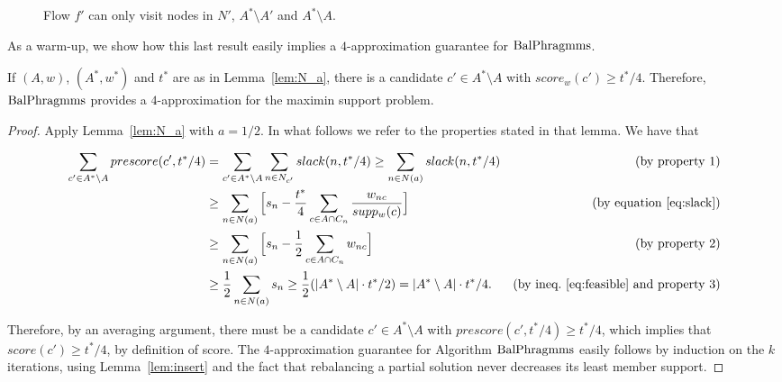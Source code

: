 \begin{figure}[htb]
\begin{center}
{
}
\end{center}
\caption{Flow $f'$ can only visit nodes in $N'$, $A^*\setminus A'$ and $A^*\setminus A$.}
\label{fig:sets}
\end{figure}

As a warm-up, we show how this last result easily implies a $4$-approximation guarantee for $\operatorname{BalPhragmms}$.

\begin{lemma}
If $(A,w)$, $(A^*,w^*)$ and $t^*$ are as in Lemma~\ref{lem:N_a}, there is a candidate $c'\in A^*\setminus A$ with $score_w(c')\geq t^*/4$. Therefore, $\operatorname{BalPhragmms}$ provides a $4$-approximation for the maximin support problem.
\end{lemma}

\begin{proof}
Apply Lemma~\ref{lem:N_a} with $a=1/2$. In what follows we refer to the properties stated in that lemma. We have that

\begin{align*}
    \sum_{c'\in A^*\setminus A} prescore(c',t^*/4) &=\sum_{c'\in A^*\setminus A} \sum_{n\in N_{c'}} slack(n,t^*/4)
    \geq \sum_{n\in N(a)} slack(n,t^*/4) & \text{(by property 1)}\\
    &\geq \sum_{n\in N(a)} \Big[ s_n - \frac{t^*}{4}\sum_{c\in A\cap C_n} \frac{w_{nc}}{supp_w(c)} \Big] &\text{(by equation \ref{eq:slack})}\\
    &\geq \sum_{n\in N(a)} \Big[ s_n - \frac{1}{2}\sum_{c\in A\cap C_n} w_{nc} \Big] &\text{(by property 2)}\\
    &\geq \frac{1}{2}\sum_{n\in N(a)} s_n 
		\geq \frac{1}{2} (|A^*\setminus A|\cdot t^*/2) = |A^*\setminus A|\cdot t^*/4. 
    &\text{(by ineq.~\ref{eq:feasible} and property 3)}
\end{align*}

Therefore, by an averaging argument, there must be a candidate $c'\in A^*\setminus A$ with $prescore(c',t^*/4)\geq t^*/4$, which implies that $score(c')\geq t^*/4$, by definition of score. The $4$-approximation guarantee for Algorithm $\operatorname{BalPhragmms}$ easily follows by induction on the $k$ iterations, using Lemma~\ref{lem:insert} and the fact that rebalancing a partial solution never decreases its least member support.
\end{proof}

